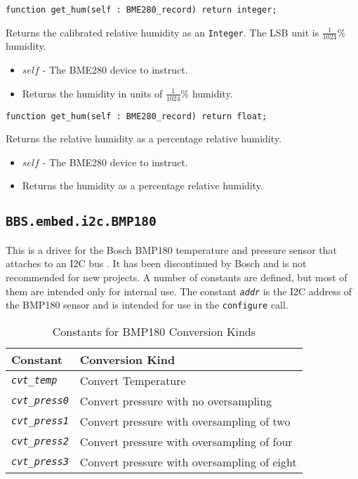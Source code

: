 \documentclass[10pt, openany]{book}
\newcommand{\package}[1]{\texttt{#1}}
\newcommand{\function}[1]{\texttt{#1}}
\newcommand{\constant}[1]{\emph{\texttt{#1}}}
\newcommand{\datatype}[1]{\texttt{#1}}
\begin{document}
\begin{lstlisting}
function get_hum(self : BME280_record) return integer;
\end{lstlisting}
Returns the calibrated relative humidity as an \datatype{Integer}.  The LSB unit is $\frac{1}{1024}$\% humidity.
\begin{itemize}
  \item $self$ - The BME280 device to instruct.
  \item Returns the humidity in units of $\frac{1}{1024}$\% humidity.
\end{itemize}

\begin{lstlisting}
function get_hum(self : BME280_record) return float;
\end{lstlisting}
Returns the relative humidity as a percentage relative humidity.
\begin{itemize}
  \item $self$ - The BME280 device to instruct.
  \item Returns the humidity as a percentage relative humidity.
\end{itemize}

\subsection{\package{BBS.embed.i2c.BMP180}}
This is a driver for the Bosch BMP180 temperature and pressure sensor that attaches to an I2C bus \cite{BMP180}.  It has been discontinued by Bosch and is not recommended for new projects.  A number of constants are defined, but most of them are intended only for internal use.  The constant \constant{addr} is the I2C address of the BMP180 sensor and is intended for use in the \function{configure} call.

\begin{table}[!h]
\begin{center}
  \begin{tabular}{l|l}
    Constant & Conversion Kind \\
    \hline
    \constant{cvt\_temp} & Convert Temperature \\
    \constant{cvt\_press0} & Convert pressure with no oversampling \\
    \constant{cvt\_press1} & Convert pressure with oversampling of two \\
    \constant{cvt\_press2} & Convert pressure with oversampling of four  \\
    \constant{cvt\_press3} & Convert pressure with oversampling of eight  \\
  \end{tabular}
  \caption{Constants for BMP180 Conversion Kinds}
  \label{tbl:BMP180Conv}
\end{center}
\end{table}
\end{document}
